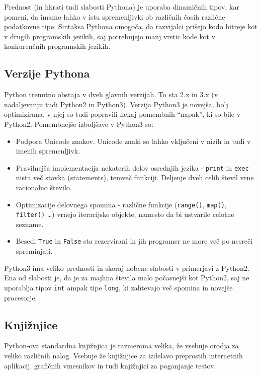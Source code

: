 \documentclass[a4paper, 12pt]{article}
\begin{document}
    Prednost (in hkrati tudi slabosti Pythona) je uporaba dinamičnih tipov, kar pomeni, da imamo lahko v istu spremenljivki ob različnih časih različne podatkovne tipe. Sintaksa Pythona omogoča, da razvijalci prišejo kodo hitreje kot v drugih programskih jezikih, saj potrebujejo manj vrstic kode kot v konkurenčnih programskih jezikih.

    \subsection{Verzije Pythona}
        Python trenutno obstaja v dveh glavnih verzijah. To sta 2.x in 3.x (v nadaljevanju tudi Python2 in Python3). Verzija Python3 je novejša, bolj optimizirana, v njej so tudi popravili nekaj pomembnih ``napak'', ki so bile v Python2. Pomembnejše izboljšave v Python3 so:
        \begin{itemize}
            \item Podpora Unicode znakov. Unicode znaki so lahko vključeni v nizih in tudi v imenih spremenljivk.
            \item Pravilnejša implementacija nekaterih delov osrednjih jezika - \texttt{print} in \texttt{exec} nista več stavka (statements), temveč funkciji. Deljenje dveh celih števil vrne racionalno število.
            \item Optimizacije delovnega spomina - različne funkcije (\texttt{range()}, \texttt{map()}, \texttt{filter()} \ldots) vrnejo iteracijske objekte, namesto da bi ustvarile celotne sezname.
            \item Besedi \texttt{True} in \texttt{False} sta rezervirani in jih programer ne more več po nesreči spreminjati.
        \end{itemize}

        Python3 ima veliko prednosti in skoraj nobene slabosti v primerjavi z Python2. Ena od slabosti je, da je za majhna števila malo počasnejši kot Python2, saj ne uporablja tipov \texttt{int} ampak tipe \texttt{long}, ki zahtevajo več spomina in novejše procesorje.


    \subsection{Knjižnjice}
        Python-ova standardna knjižnjica je razmeroma velika, že vsebuje orodja za veliko različnih nalog. Vsebuje že knjižnjice za izdelavo preprostih internetnih aplikacij, grafičnih vmesnikov in tudi knjižnjici za poganjanje testov.
\end{document}
